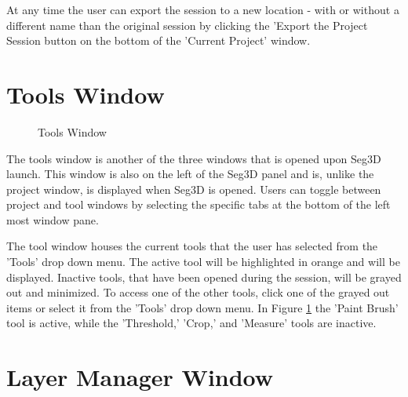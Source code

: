 \documentclass[fleqn,11pt,openany]{book}
\begin{document}
At any time the user can export the session to a new location - with or without a different name than the original session by clicking the 'Export the Project Session button on the bottom of the  'Current Project' window.

\section{Tools Window}
\begin{figure}[b]
\caption{Tools Window}\label{fig:ToolWindow}
\end{figure}
The tools window is another of the three windows that is opened upon Seg3D launch.  
This window is also on the left of the Seg3D panel and is, unlike the project window, is displayed when Seg3D is opened.  
Users can toggle between project and tool windows by selecting the specific tabs at the bottom of the left most window pane.

The tool window houses the current tools that the user has selected from the 'Tools' drop down menu.  
The active tool will be highlighted in orange and will be displayed.  
Inactive tools, that have been opened during the session, will be grayed out and minimized.  
To access one of the other tools, click one of the grayed out items or select it from the 'Tools' drop down menu.  
In Figure \ref{fig:ToolWindow} the 'Paint Brush' tool is active, while the 'Threshold,' 'Crop,' and 'Measure' tools are inactive.



\section{Layer Manager Window}
\end{document}
